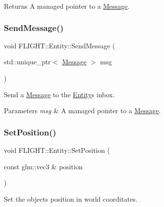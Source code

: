 \begin{DoxyReturn}{Returns}
A managed pointer to a \hyperlink{class_f_l_i_g_h_t_1_1_message}{Message}. 
\end{DoxyReturn}
\mbox{\label{class_f_l_i_g_h_t_1_1_entity_a99b530391d784811e89df71bcecdf61a}} 
\subsubsection{\texorpdfstring{Send\+Message()}{SendMessage()}}
{\footnotesize\ttfamily void F\+L\+I\+G\+H\+T\+::\+Entity\+::\+Send\+Message (\begin{DoxyParamCaption}\item[{std\+::unique\+\_\+ptr$<$ \hyperlink{class_f_l_i_g_h_t_1_1_message}{Message} $>$}]{msg }\end{DoxyParamCaption})}



Send a \hyperlink{class_f_l_i_g_h_t_1_1_message}{Message} to the \hyperlink{class_f_l_i_g_h_t_1_1_entity}{Entity}\textquotesingle{}s inbox. 


\begin{DoxyParams}{Parameters}
{\em msg} & A managed pointer to a \hyperlink{class_f_l_i_g_h_t_1_1_message}{Message}. \\
\hline
\end{DoxyParams}
\mbox{\label{class_f_l_i_g_h_t_1_1_entity_a9e99ebb85e0046e474420a3c843e4f45}} 
\subsubsection{\texorpdfstring{Set\+Position()}{SetPosition()}}
{\footnotesize\ttfamily void F\+L\+I\+G\+H\+T\+::\+Entity\+::\+Set\+Position (\begin{DoxyParamCaption}\item[{const glm\+::vec3 \&}]{position }\end{DoxyParamCaption})}



Set the object\textquotesingle{}s position in world coorditates. 


